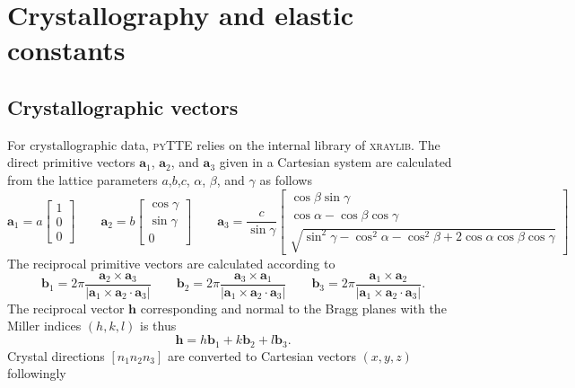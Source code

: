 \documentclass[11pt,a4paper]{article}
\begin{document}
\section{Crystallography and elastic constants}
\subsection{Crystallographic vectors}
For crystallographic data, \textsc{pyTTE} relies on the internal library of \textsc{xraylib}\cite{Schoonjans_2011}. The direct primitive vectors $\mathbf{a}_1$, $\mathbf{a}_2$, and $\mathbf{a}_3$ given in a Cartesian system are calculated from the lattice parameters $a$,$b$,$c$, $\alpha$, $\beta$, and $\gamma$ as follows
\begin{equation}
\mathbf{a}_1 = a \left[\begin{matrix} 1 \\ 0 \\ 0 \end{matrix}\right] \qquad
\mathbf{a}_2 = b \left[\begin{matrix} \cos \gamma \\ \sin \gamma \\ 0 \end{matrix}\right] \qquad
\mathbf{a}_3 = \frac{c}{\sin \gamma} \left[\begin{matrix} \cos \beta \sin \gamma \\ \cos \alpha - \cos\beta \cos\gamma \\ 
\sqrt{\sin^2 \gamma - \cos^2 \alpha - \cos^2 \beta + 2 \cos \alpha \cos \beta \cos \gamma} \end{matrix}\right]
\end{equation}
The reciprocal primitive vectors are calculated according to
\begin{equation}
\mathbf{b}_1 = 2\pi \frac{\mathbf{a}_2 \times \mathbf{a}_3}{|\mathbf{a}_1 \times \mathbf{a}_2 \cdot \mathbf{a}_3|} \qquad
\mathbf{b}_2 = 2\pi \frac{\mathbf{a}_3 \times \mathbf{a}_1}{|\mathbf{a}_1 \times \mathbf{a}_2 \cdot \mathbf{a}_3|} \qquad
\mathbf{b}_3 = 2\pi \frac{\mathbf{a}_1 \times \mathbf{a}_2}{|\mathbf{a}_1 \times \mathbf{a}_2 \cdot \mathbf{a}_3|}.
\end{equation} 
The reciprocal vector $\mathbf{h}$ corresponding and normal to the Bragg planes with the Miller indices $(h,k,l)$ is thus
\begin{equation}
\mathbf{h} = h \mathbf{b}_1 + k \mathbf{b}_2 + l \mathbf{b}_3.
\end{equation}
Crystal directions $[n_1 n_2 n_3]$ are converted to Cartesian vectors $(x,y,z)$ followingly
\end{document}
